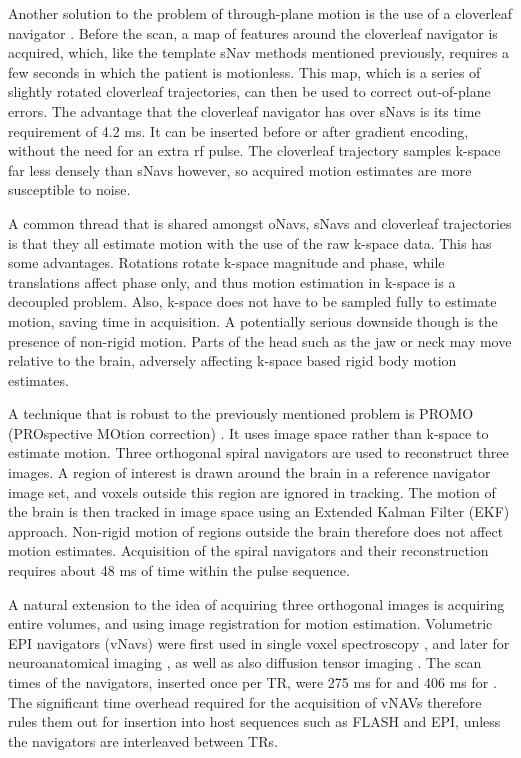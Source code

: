 \documentclass[class=article, crop=false]{standalone}
\begin{document}
\par
Another solution to the problem of through-plane motion is the use of a cloverleaf navigator \parencite{VanDerKouwe2006}. Before the scan, a map of features around the cloverleaf navigator is acquired, which, like the template sNav methods mentioned previously, requires a few seconds in which the patient is motionless. This map, which is a series of slightly rotated cloverleaf trajectories, can then be used to correct out-of-plane errors. The advantage that the cloverleaf navigator has over sNavs is its time requirement of 4.2 ms. It can be inserted before or after gradient encoding, without the need for an extra rf pulse. The cloverleaf trajectory samples k-space far less densely than sNavs however, so acquired motion estimates are more susceptible to noise.
\par
A common thread that is shared amongst oNavs, sNavs and cloverleaf trajectories is that they all estimate motion with the use of the raw k-space data. This has some advantages. Rotations rotate k-space magnitude and phase, while translations affect phase only, and thus motion estimation in k-space is a decoupled problem. Also, k-space does not have to be sampled fully to estimate motion, saving time in acquisition. A potentially serious downside though is the presence of non-rigid motion. Parts of the head such as the jaw or neck may move relative to the brain, adversely affecting k-space based rigid body motion estimates.
\par
A technique that is robust to the previously mentioned problem is PROMO (PROspective MOtion correction) \parencite{White2010a}. It uses image space rather than k-space to estimate motion. Three orthogonal spiral navigators are used to reconstruct three  images. A region of interest is drawn around the brain in a reference navigator image set, and voxels outside this region are ignored in tracking. The motion of the brain is then tracked in image space using an Extended Kalman Filter (EKF) approach. Non-rigid motion of regions outside the brain therefore does not affect motion estimates. Acquisition of the spiral navigators and their reconstruction requires about 48 ms of time within the pulse sequence.
\par
A natural extension to the idea of acquiring three orthogonal images is acquiring entire volumes, and using image registration for motion estimation. Volumetric EPI navigators (vNavs) were first used in single voxel spectroscopy \parencite{Hess2011}, and later for neuroanatomical imaging \parencite{Tisdall2012}, as well as also diffusion tensor imaging \parencite{MRM:MRM23314}. The scan times of the navigators, inserted once per TR, were 275 ms for \cite{Tisdall2012} and 406 ms for \cite{MRM:MRM23314}. The significant time overhead required for the acquisition of vNAVs therefore rules them out for insertion into host sequences such as FLASH and EPI, unless the navigators are interleaved between TRs.
\end{document}
